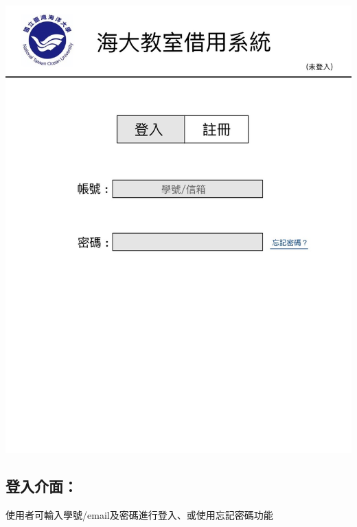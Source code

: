 \documentclass{article}
\begin{document}
\begin{minipage}{0.6\linewidth}
	\includegraphics[height=0.4\textheight]{Log_In_GUI.jpg}
\end{minipage}
\begin{minipage}{0.4\linewidth}
	\subsection*{登入介面：}使用者可輸入學號/email及密碼進行登入、或使用忘記密碼功能
\end{minipage}
\end{document}
